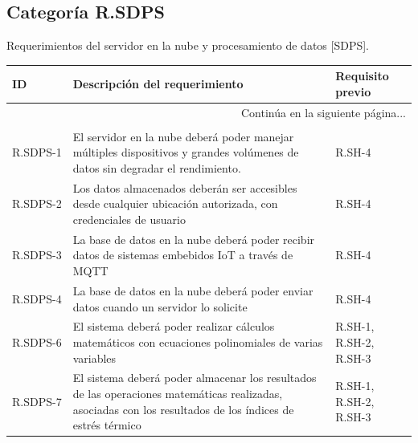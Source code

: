 \documentclass{article}%
\begin{document}
\subsection{Categoría R.SDPS}%
\label{subsec:CategoraR.SDPS}%
Requerimientos del servidor en la nube y procesamiento de datos [SDPS].\newline%
\newline%
%
\begin{longtable}{|p{2cm}|p{9cm}|p{2.5cm}|}%
\hline%
ID&Descripción del requerimiento&Requisito previo\\%
\hline%
\endhead%
\hline%
\multicolumn{3}{|r|}{Continúa en la siguiente página...}\\%
\hline%
\endfoot%
\hline%
\multicolumn{3}{|r|}{Fin de la tabla}\\%
\hline%
\endlastfoot%
R.SDPS{-}1&El servidor en la nube deberá poder manejar múltiples dispositivos y grandes volúmenes de datos sin degradar el rendimiento.&R.SH{-}4\\%
\hline%
R.SDPS{-}2&Los datos almacenados deberán ser accesibles desde cualquier ubicación autorizada, con credenciales de usuario&R.SH{-}4\\%
\hline%
R.SDPS{-}3&La base de datos en la nube deberá poder recibir datos de sistemas embebidos IoT a través de MQTT&R.SH{-}4\\%
\hline%
R.SDPS{-}4&La base de datos en la nube deberá poder enviar datos cuando un servidor lo solicite&R.SH{-}4\\%
\hline%
R.SDPS{-}6&El sistema deberá poder realizar cálculos matemáticos con ecuaciones polinomiales de varias variables& R.SH{-}1, R.SH{-}2, R.SH{-}3\\%
\hline%
R.SDPS{-}7&El sistema deberá poder almacenar los resultados de las operaciones matemáticas realizadas, asociadas con los resultados de los índices de estrés térmico& R.SH{-}1, R.SH{-}2, R.SH{-}3\\%
\hline%
\end{longtable}

%
\newpage%
\end{document}
